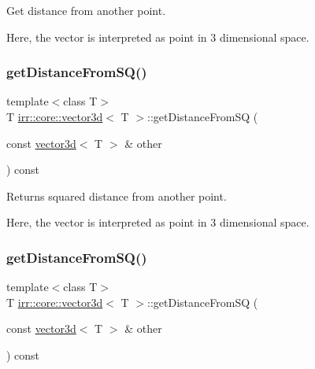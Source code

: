 Get distance from another point. 

Here, the vector is interpreted as point in 3 dimensional space. \mbox{\label{classirr_1_1core_1_1vector3d_a01ba1b5d0cbf1b47245304e62c7fb5a1}} 
\subsubsection{\texorpdfstring{get\+Distance\+From\+S\+Q()}{getDistanceFromSQ()}\hspace{0.1cm}{\footnotesize\ttfamily [1/2]}}
{\footnotesize\ttfamily template$<$class T$>$ \\
T \hyperlink{classirr_1_1core_1_1vector3d}{irr\+::core\+::vector3d}$<$ T $>$\+::get\+Distance\+From\+SQ (\begin{DoxyParamCaption}\item[{const \hyperlink{classirr_1_1core_1_1vector3d}{vector3d}$<$ T $>$ \&}]{other }\end{DoxyParamCaption}) const\hspace{0.3cm}{\ttfamily [inline]}}



Returns squared distance from another point. 

Here, the vector is interpreted as point in 3 dimensional space. \mbox{\label{classirr_1_1core_1_1vector3d_a01ba1b5d0cbf1b47245304e62c7fb5a1}} 
\subsubsection{\texorpdfstring{get\+Distance\+From\+S\+Q()}{getDistanceFromSQ()}\hspace{0.1cm}{\footnotesize\ttfamily [2/2]}}
{\footnotesize\ttfamily template$<$class T$>$ \\
T \hyperlink{classirr_1_1core_1_1vector3d}{irr\+::core\+::vector3d}$<$ T $>$\+::get\+Distance\+From\+SQ (\begin{DoxyParamCaption}\item[{const \hyperlink{classirr_1_1core_1_1vector3d}{vector3d}$<$ T $>$ \&}]{other }\end{DoxyParamCaption}) const\hspace{0.3cm}{\ttfamily [inline]}}




